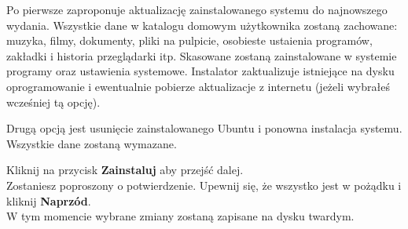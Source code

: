 Po pierwsze zaproponuje aktualizację zainstalowanego systemu do najnowszego wydania. Wszystkie dane w katalogu domowym użytkownika zostaną zachowane: muzyka, filmy, dokumenty, pliki na pulpicie, osobieste ustaienia programów, zakładki i historia przeglądarki itp.
Skasowane zostaną zainstalowane w systemie programy oraz ustawienia systemowe. Instalator zaktualizuje istniejące na dysku oprogramowanie i ewentualnie pobierze aktualizacje z internetu (jeżeli wybrałeś wcześniej tą opcję).

Drugą opcją jest usunięcie zainstalowanego Ubuntu i ponowna instalacja systemu. Wszystkie dane zostaną wymazane.
\begin{flushright}
Kliknij na przycisk \textbf{Zainstaluj} aby przejść dalej.\\
Zostaniesz poproszony o potwierdzenie. Upewnij się, że wszystko jest w pożądku i kliknij \textbf{Naprzód}.\\
W tym momencie wybrane zmiany zostaną zapisane na dysku twardym.
\end{flushright}
\clearpage

